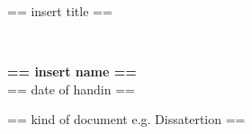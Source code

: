 \newsavebox{\Prof}

\begin{titlepage}
\begin{center}
\underline{\hspace{15cm}} 
\vskip 3cm
{\huge\bfseries \par{ == insert title == } }\\
\vskip 3cm
\underline{\hspace{15cm}} 

\vskip 5cm

\textbf{ == insert name == }\\
== date of handin ==

\vskip 7cm

== kind of document e.g. Dissatertion ==\\

\end{center}
\vfill
\end{titlepage}
